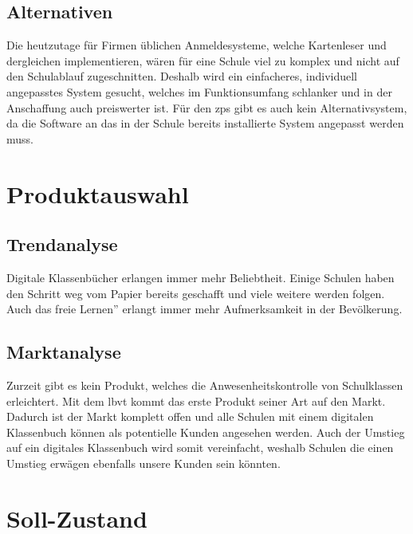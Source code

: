 \subsection{Alternativen}
Die heutzutage für Firmen üblichen Anmeldesysteme, welche Kartenleser und dergleichen implementieren, wären für eine Schule viel zu komplex und nicht auf den Schulablauf zugeschnitten. Deshalb wird ein einfacheres, individuell angepasstes System gesucht, welches im Funktionsumfang schlanker und in der Anschaffung auch preiswerter ist. Für den \gls{zps} gibt es auch kein Alternativsystem, da die Software an das in der Schule bereits installierte System angepasst werden muss. 
\section{Produktauswahl}
\subsection{Trendanalyse}
Digitale Klassenbücher erlangen immer mehr Beliebtheit. Einige Schulen haben den Schritt weg vom Papier bereits geschafft und viele weitere werden folgen. Auch das \glqq freie Lernen'' erlangt immer mehr Aufmerksamkeit in der Bevölkerung. 
\subsection{Marktanalyse}
Zurzeit gibt es kein Produkt, welches die Anwesenheitskontrolle von Schulklassen erleichtert. Mit dem \gls{lbvt} kommt das erste Produkt seiner Art auf den Markt. Dadurch ist der Markt komplett offen und alle Schulen mit einem digitalen Klassenbuch können als potentielle Kunden angesehen werden. Auch der Umstieg auf ein digitales Klassenbuch wird somit vereinfacht, weshalb Schulen die einen Umstieg erwägen ebenfalls unsere Kunden sein könnten.
\section{Soll-Zustand}
